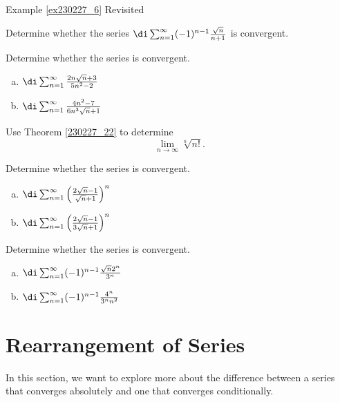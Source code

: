 \begin{example}{\linkt Example \ref{ex230227_6} Revisited}
\begin{example}[label=ex230227_13]{}
\begin{question}{\themyquestion}
Determine whether the series $\di\sum_{n=1}^{\infty}(-1)^{n-1}\frac{\sqrt{n}}{n+1}$ is convergent.
\end{question}
\atc
\begin{question}{\themyquestion}
Determine whether the series is convergent.
\begin{enumerate}[(a)]
\item $\di \sum_{n=1}^{\infty}\frac{2n\sqrt{n}+3}{5n^2-2}$
\item  $\di \sum_{n=1}^{\infty}\frac{4n^2-7}{6n^3\sqrt{n}+1}$
\end{enumerate}
\end{question}
\atc
\begin{question}{\themyquestion}
Use Theorem \ref{230227_22} to determine
\[\lim_{n\to\infty}\sqrt[n]{n!}.\]
\end{question}
\atc





\begin{question}{\themyquestion}
Determine whether the series is convergent.
\begin{enumerate}[(a)]
\item $\di \sum_{n=1}^{\infty}\left(\frac{2 \sqrt{n}-1}{\sqrt{n}+1}\right)^n$
\item  $\di \sum_{n=1}^{\infty}\left(\frac{2 \sqrt{n}-1}{3\sqrt{n}+1}\right)^n$
\end{enumerate}
\end{question}
\atc

\begin{question}{\themyquestion}
Determine whether the series is convergent.
\begin{enumerate}[(a)]
\item $\di \sum_{n=1}^{\infty}(-1)^{n-1}\frac{\sqrt{n}2^n}{3^n}$
\item  $\di \sum_{n=1}^{\infty}(-1)^{n-1}\frac{4^n}{3^nn^2}$
\end{enumerate}
\end{question}
 

\vp


\section{Rearrangement of Series}\label{sec5.3}
In this section, we want to explore more about the difference between a series that converges absolutely and one that converges conditionally.
 


\end{example}
\end{example}
